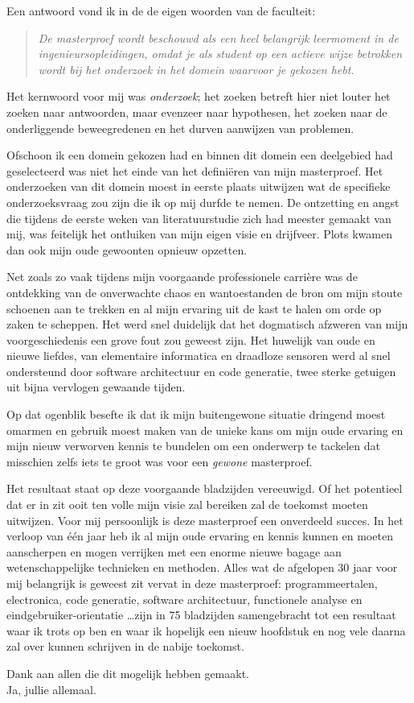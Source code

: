 Een antwoord vond ik in de de eigen woorden van de faculteit:
\begin{quote}
\emph{De masterproef wordt beschouwd als een heel belangrijk leermoment in de
ingenieursopleidingen, omdat je als student op een actieve wijze betrokken
wordt bij het onderzoek in het domein waarvoor je gekozen hebt.}
\end{quote}

Het kernwoord voor mij was \emph{onderzoek}; het zoeken betreft hier niet
louter het zoeken naar antwoorden, maar evenzeer naar hypothesen, het zoeken
naar de onderliggende beweegredenen en het durven aanwijzen van problemen.

Ofschoon ik een domein gekozen had en binnen dit domein een deelgebied had
geselecteerd was niet het einde van het defini\"eren van mijn masterproef. Het
onderzoeken van dit domein moest in eerste plaats uitwijzen wat de specifieke
onderzoeksvraag zou zijn die ik op mij durfde te nemen. De ontzetting en angst
die tijdens de eerste weken van literatuurstudie zich had meester gemaakt van
mij, was feitelijk het ontluiken van mijn eigen visie en drijfveer. Plots
kwamen dan ook mijn oude gewoonten opnieuw opzetten.

Net zoals zo vaak tijdens mijn voorgaande professionele carri\`ere was de
ontdekking van de onverwachte chaos en wantoestanden de bron om mijn stoute
schoenen aan te trekken en al mijn ervaring uit de kast te halen om orde op
zaken te scheppen. Het werd snel duidelijk dat het dogmatisch afzweren van mijn
voorgeschiedenis een grove fout zou geweest zijn. Het huwelijk van oude en
nieuwe liefdes, van elementaire informatica en draadloze sensoren werd al snel
ondersteund door software architectuur en code generatie, twee sterke getuigen
uit bijna vervlogen gewaande tijden.

Op dat ogenblik besefte ik dat ik mijn buitengewone situatie dringend moest
omarmen en gebruik moest maken van de unieke kans om mijn oude ervaring en mijn
nieuw verworven kennis te bundelen om een onderwerp te tackelen dat misschien
zelfs iets te groot was voor een \emph{gewone} masterproef.

Het resultaat staat op deze voorgaande bladzijden vereeuwigd. Of het potentieel
dat er in zit ooit ten volle mijn visie zal bereiken zal de toekomst moeten
uitwijzen. Voor mij persoonlijk is deze masterproef een onverdeeld succes. In
het verloop van \'e\'en jaar heb ik al mijn oude ervaring en kennis kunnen en
moeten aanscherpen en mogen verrijken met een enorme nieuwe bagage aan
wetenschappelijke technieken en methoden. Alles wat de afgelopen 30 jaar voor
mij belangrijk is geweest zit vervat in deze masterproef: programmeertalen,
electronica, code generatie, software architectuur, functionele analyse en
eindgebruiker-orientatie \dots zijn in 75 bladzijden samengebracht tot een
resultaat waar ik trots op ben en waar ik hopelijk een nieuw hoofdstuk en nog
vele daarna zal over kunnen schrijven in de nabije toekomst.

\bigskip

Dank aan allen die dit mogelijk hebben gemaakt.\\
Ja, jullie allemaal.
